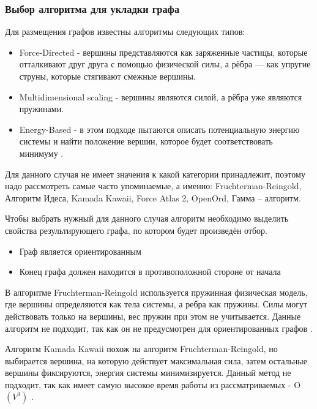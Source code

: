 \def\notedate{2022.11.29}
\def\currentauthor{Журавлев Н.В. (РК6-72Б)}
\subsubsection{Выбор алгоритма для укладки графа}
Для размещения графов известны алгоритмы следующих типов:
\begin{itemize}
\item Force-Directed - вершины представляются как заряженные частицы, которые отталкивают друг друга с помощью физической силы, а рёбра — как упругие струны, которые стягивают смежные вершины.
\item Multidimensional scaling - вершины являются силой, а рёбра уже являются пружинами.
\item Energy-Based - в этом подходе пытаются описать потенциальную энергию системы и найти положение вершин, которое будет соответствовать минимуму \cite{alg-graph}.
\end{itemize}

Для данного случая не имеет значения к какой категории принадлежит, поэтому надо рассмотреть самые часто упоминаемые, а именно: Fruchterman-Reingold, Алгоритм Идеса, Kamada Kawaii, Force Atlas 2, OpenOrd, Гамма – алгоритм.

Чтобы выбрать нужный для данного случая алгоритм необходимо выделить свойства результирующего графа, по котором будет произведён отбор.
\begin{itemize}
\item Граф является ориентированным
\item Конец графа должен находится в противоположной стороне от начала
\end{itemize}

В алгоритме Fruchterman-Reingold используется пружинная физическая модель, где вершины определяются как тела системы, а ребра как пружины. Силы могут действовать только на вершины, вес пружин при этом не учитывается. Данные алгоритм не подходит, так как он не предусмотрен для ориентированных графов \cite{alg-fruchterman}.

Алгоритм Kamada Kawaii похож на алгоритм Fruchterman-Reingold, но выбирается вершина, на которую действует максимальная сила, затем остальные вершины фиксируются, энергия системы минимизируется. Данный метод не подходит, так как имеет самую высокое время работы из рассматриваемых - O$(V^3)$ \cite{alg-kamada-kawai}.


